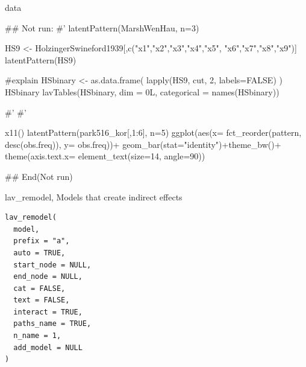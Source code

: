 \documentclass[a4paper]{book}
\begin{document}
%
\begin{Value}
data
\end{Value}
%
\begin{Examples}
\begin{ExampleCode}

## Not run: 
#'
latentPattern(MarshWenHau, n=3)

HS9 <- HolzingerSwineford1939[,c("x1","x2","x3","x4","x5",
                                 "x6","x7","x8","x9")]
latentPattern(HS9)

#explain
HSbinary <- as.data.frame( lapply(HS9, cut, 2, labels=FALSE) )
HSbinary %
lavTables(HSbinary, dim = 0L, categorical = names(HSbinary)) %

#'
#'

x11()
latentPattern(park516_kor[,1:6], n=5) %
  ggplot(aes(x= fct_reorder(pattern, desc(obs.freq)), y= obs.freq))+
  geom_bar(stat="identity")+theme_bw()+
  theme(axis.text.x= element_text(size=14, angle=90))

## End(Not run)


\end{ExampleCode}
\end{Examples}
%
\begin{Description}
lav\_remodel, Models that create indirect effects
\end{Description}
%
\begin{Usage}
\begin{verbatim}
lav_remodel(
  model,
  prefix = "a",
  auto = TRUE,
  start_node = NULL,
  end_node = NULL,
  cat = FALSE,
  text = FALSE,
  interact = TRUE,
  paths_name = TRUE,
  n_name = 1,
  add_model = NULL
)
\end{verbatim}
\end{Usage}
%
\end{document}
